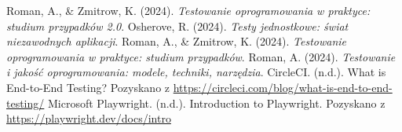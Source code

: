\documentclass[12pt]{report}
\begin{document}
\begin{thebibliography}{9}
     Roman, A., \& Zmitrow, K. (2024). \textit{Testowanie oprogramowania w praktyce: studium przypadków 2.0}.
     Osherove, R. (2024). \textit{Testy jednostkowe: świat niezawodnych aplikacji}.
     Roman, A., \& Zmitrow, K. (2024). \textit{Testowanie oprogramowania w praktyce: studium przypadków}.
     Roman, A. (2024). \textit{Testowanie i jakość oprogramowania: modele, techniki, narzędzia}.
     CircleCI. (n.d.). What is End-to-End Testing? Pozyskano z \url{https://circleci.com/blog/what-is-end-to-end-testing/}
     Microsoft Playwright. (n.d.). Introduction to Playwright. Pozyskano z \url{https://playwright.dev/docs/intro}
\end{thebibliography}
\end{document}
